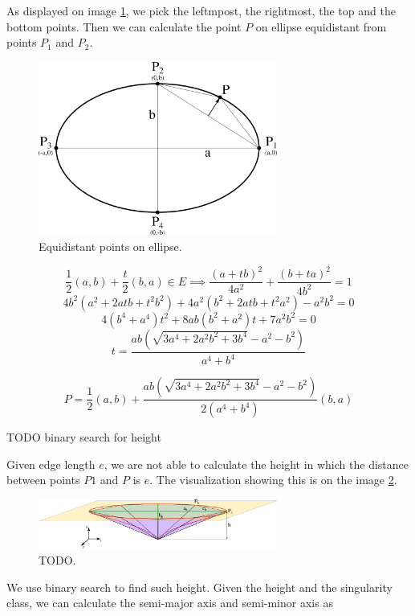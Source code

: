 As displayed on image \ref{img:13}, we pick the leftmpost, the rightmost, the top
and the bottom points. Then we can calculate the point $P$ on ellipse equidistant
from points $P_1$ and $P_2$.

\begin{figure}
    \centerline{\includegraphics[width=0.7\textwidth]{images/img13}}
    \caption[Equidistant points on ellipse.]
    {Equidistant points on ellipse.}
    \label{img:13}
\end{figure}

$$\frac{1}{2}(a,b) + \frac{t}{2}(b,a) \in E \implies 
\frac{(a+tb)^2}{4a^2} + \frac{(b+ta)^2}{4b^2} = 1$$
$$4b^2(a^2+2atb+t^2b^2)+4a^2(b^2+2atb+t^2a^2)-a^2b^2=0$$
$$4(b^4+a^4)t^2+8ab(b^2+a^2)t+7a^2b^2=0$$
$$t=\frac{ab(\sqrt{3a^4+2a^2b^2+3b^4}-a^2-b^2)}{a^4+b^4}$$

$$P=\frac{1}{2}(a,b) + \frac{ab(\sqrt{3a^4+2a^2b^2+3b^4}-a^2-b^2)}{2(a^4+b^4)}(b,a)$$

TODO binary search for height

Given edge length $e$, we are not able to calculate the height in which the distance
between points $P1$ and $P$ is $e$. The visualization showing this is on the image \ref{img:17}.

\begin{figure}
    \centerline{\includegraphics[width=0.7\textwidth]{images/img17}}
    \caption[TODO.]
    {TODO.}
    \label{img:17}
\end{figure}

We use binary search to find such height.
Given the height and the singularity class, we can calculate the semi-major axis
and semi-minor axis as 

